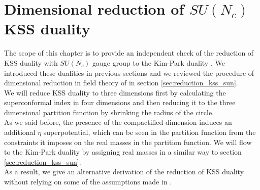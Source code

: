 

\chapter{ Dimensional reduction of $SU(N_c)$ KSS duality}
\label{chap:my_work}

The scope of this chapter is to provide an independent check  of the reduction of KSS duality with $SU(N_c)$ gauge group to the Kim-Park duality \cite{Nii:2014jsa}.
We introduced these dualities in previous sections and we reviewed the procedure of dimensional reduction in field theory of \cite{Nii:2014jsa} in section \ref{sec:reduction_kss_sun}.\\
We will reduce KSS duality to three dimensions first by calculating the superconformal index in four dimensions and then reducing it to the three dimensional partition function by shrinking the radius of the circle.\\
As we said before, the presence of the compactified dimension induces an additional $\eta$ superpotential, which can be seen in the partition function from the constraints it imposes on the real masses in the partition function.
We will flow to the Kim-Park duality by assigning real masses in a similar way to section \ref{sec:reduction_kss_sun}.\\
As a result, we give an alternative derivation of the reduction of KSS duality without relying on some of the assumptions made in \cite{Nii:2014jsa}.







